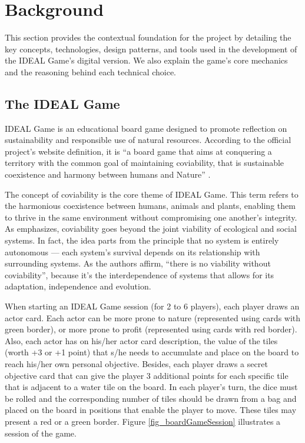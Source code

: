 \documentclass[english]{sbc2025}
\begin{document}
\section{Background}
 
This section provides the contextual foundation for the project by detailing the key concepts, technologies, design patterns, and tools used in the development of the IDEAL Game's digital version. We also explain the game’s core mechanics and the reasoning behind each technical choice.

\subsection{The IDEAL Game}
IDEAL Game is an educational board game designed to promote reflection on sustainability and responsible use of natural resources. According to the official project’s website definition, it is ``a board game that aims at conquering a territory with the common goal of maintaining coviability, that is sustainable coexistence and harmony between humans and Nature'' \citep{idealgame_site}.


The concept of coviability is the core theme of IDEAL Game. This term refers to the harmonious coexistence between humans, animals and plants, enabling them to thrive in the same environment without compromising one another’s integrity. As  \citep{barriere2019coviability} emphasizes, coviability goes beyond the joint viability of ecological and social systems. In fact, the idea parts from the principle that no system is entirely autonomous — each system's survival depends on its relationship with surrounding systems. As the authors affirm, “there is no viability without coviability”, because it's the interdependence of systems that allows for its adaptation, independence and evolution.

When starting an IDEAL Game session (for 2 to 6 players), each player draws an actor card. Each actor can be more prone to nature (represented using cards with green border), or more prone to profit (represented using cards with red border). Also, each actor has on his/her actor card description, the value of the tiles (worth +3 or +1 point) that s/he needs to accumulate and place on the board to reach his/her own personal objective. Besides, each player draws a secret objective card that can give the player 3 additional points for each specific tile that is adjacent to a water tile on the board. In each player’s turn, the dice must be rolled and the corresponding number of tiles should be drawn from a bag and placed on the board in positions that enable the player to move. These tiles may present a red or a green border. Figure \ref{fig_boardGameSession} illustrates a session of the game.
\end{document}
